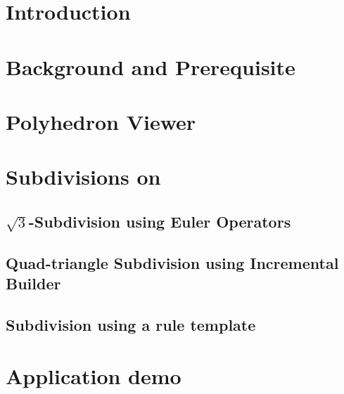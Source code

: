 \documentclass[letter,twoside,10pt]{article}
\begin{document}
\section{Introduction}


\section{Background and Prerequisite}
 

\section{Polyhedron Viewer}


\section{Subdivisions on \cgalpoly}

\subsection{$\sqrt{3}$-Subdivision using Euler Operators}


\subsection{Quad-triangle Subdivision using Incremental Builder}


\subsection{Subdivision using a rule template}
\label{sec:subdivision_rule}
%

\section{Application demo}
%




\end{document}
